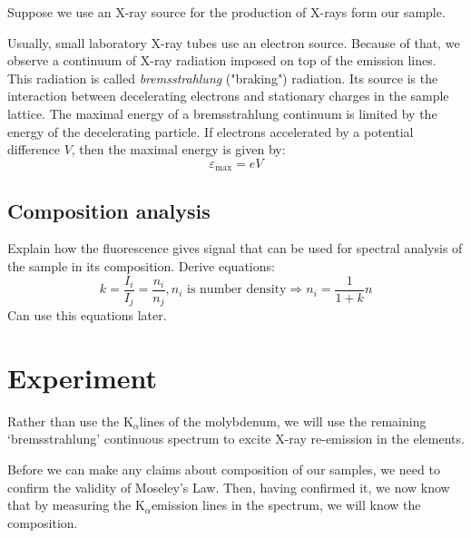 \documentclass[11pt,a4paper,twoside,onecolumn]{article}
\newcommand{\Kalpha}{$\mathrm{K}_\alpha$}
\begin{document}
Suppose we use an X-ray source for the production of X-rays form our sample.

Usually, small laboratory X-ray tubes use an electron source. Because of that, we observe a continuum of X-ray radiation imposed on top of the emission lines. This radiation is called \emph{bremsstrahlung} ("braking") radiation. Its source is the interaction between decelerating electrons and stationary charges in the sample lattice. The maximal energy of a bremsstrahlung continuum is limited by the energy of the decelerating particle. If electrons accelerated by a potential difference $V$, then the maximal energy is given by:
\begin{equation}
    \varepsilon_\mathrm{max} = eV
\end{equation}

\subsection{Composition analysis}
Explain how the fluorescence gives signal that can be used for spectral analysis of the sample in its composition. Derive equations:
\begin{equation}
   k = \frac{I_i}{I_j} = \frac{n_i}{n_j}, \text{$n_i$ is number density} \Rightarrow n_i = \frac{1}{1+k} n
\end{equation}
Can use this equations later.

\section{Experiment}

Rather than use the \Kalpha lines of the molybdenum, we will use the remaining `bremsstrahlung' continuous spectrum to excite X-ray re-emission in the elements.

Before we can make any claims about composition of our samples, we need to confirm the validity of Moseley's Law. Then, having confirmed it, we now know that by measuring the \Kalpha emission lines in the spectrum, we will know the composition.
\end{document}
